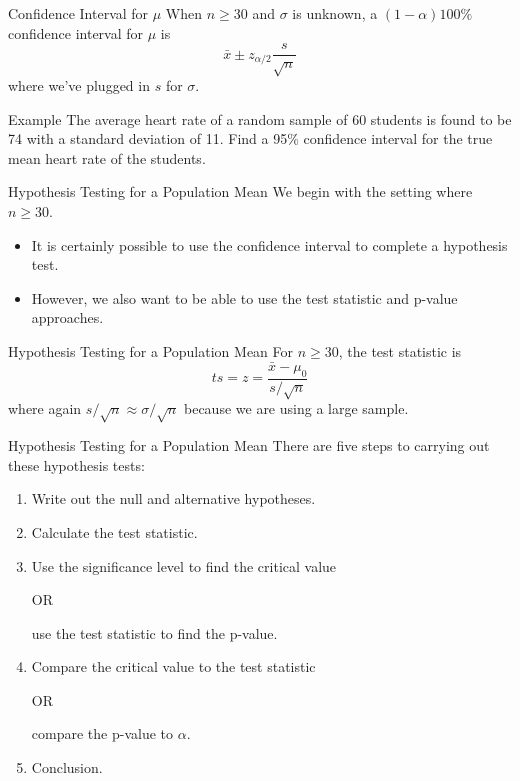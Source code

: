 \begin{frame}{Confidence Interval for $\mu$}
    When $n \ge 30$ and $\sigma$ is unknown, a $(1-\alpha)100\%$ confidence interval for $\mu$ is
    \[
        \bar{x} \pm z_{\alpha/2}\frac{s}{\sqrt{n}}
    \]
    where we've plugged in $s$ for $\sigma$.
\end{frame}

\begin{frame}{Example}
    The average heart rate of a random sample of 60 students is found to be 74 with a standard deviation of 11. Find a 95\% confidence interval for the true mean heart rate of the students. 
\end{frame}

\begin{frame}{Hypothesis Testing for a Population Mean}
    We begin with the setting where $n\ge 30$. 
    \begin{itemize}
        \item It is certainly possible to use the confidence interval to complete a hypothesis test.
        \item However, we also want to be able to use the test statistic and p-value approaches.
    \end{itemize}
\end{frame}

\begin{frame}{Hypothesis Testing for a Population Mean}
    For $n \ge 30$, the test statistic is
    \[
        ts = z = \frac{\bar{x} - \mu_0}{s / \sqrt{n}}
    \]
    where again $s/\sqrt{n} \approx \sigma/\sqrt{n}$ because we are using a large sample.
\end{frame}

\begin{frame}{Hypothesis Testing for a Population Mean}
    There are five steps to carrying out these hypothesis tests:
    \begin{enumerate}
        \item Write out the null and alternative hypotheses.
        \item Calculate the test statistic.
        \item Use the significance level to find the critical value
            \begin{center}
                OR
            \end{center}
            use the test statistic to find the p-value.
        \item Compare the critical value to the test statistic
            \begin{center}
                OR
            \end{center}
            compare the p-value to $\alpha$.
        \item Conclusion.
    \end{enumerate}
\end{frame}

